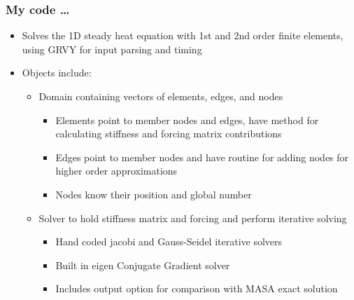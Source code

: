 \documentclass[unknownkeysallowed,12pt,mathserif]{beamer}
\begin{document}
\begin{frame}
\frametitle{My code \ldots}

\begin{itemize}
\item Solves the 1D steady heat equation with 1st and 2nd order finite elements, using GRVY for input parsing and timing
\item Objects include: 
\begin{itemize}
\item Domain containing vectors of elements, edges, and nodes
\begin{itemize}
\item Elements point to member nodes and edges, have method for calculating stiffness and forcing matrix contributions
\item Edges point to member nodes and have routine for adding nodes for higher order approximations
\item Nodes know their position and global number
\end{itemize}
\item Solver to hold stiffness matrix and forcing and perform iterative solving
\begin{itemize}
\item Hand coded jacobi and Gauss-Seidel iterative solvers
\item Built in eigen Conjugate Gradient solver
\item Includes output option for comparison with MASA exact solution
\end{itemize}
\end{itemize}
\end{itemize}

\end{frame}
\end{document}
